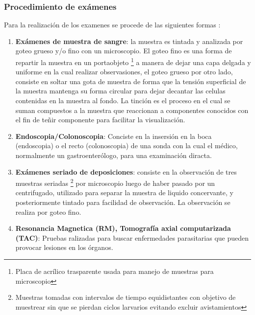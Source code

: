 \documentclass[letter,12pt]{report}
\begin{document}
\subsubsection{Procedimiento de exámenes}

Para la realización de los examenes se procede de las siguientes formas \cite{c01}:

\begin{enumerate}
    \item \textbf{Exámenes de muestra de sangre}: la muestra es tintada y analizada por
        goteo grueso y/o fino con un microscopio. El goteo fino es una forma de repartir
        la muestra en un portaobjeto \footnote{Placa de acrílico trasparente usada para
        manejo de muestras para microscopio} a manera de dejar una capa delgada y
        uniforme en la cual realizar observasiones, el goteo grueso por otro lado,
        consiste en soltar una gota de muestra de forma que la tensión superficial de la
        muestra mantenga su forma circular para dejar decantar las celulas contenidas en
        la muestra al fondo.  La tinción es el proceso en el cual se suman compuestos a
        la muestra que reaccionan a componentes conocidos con el fin de teñir componente
        para facilitar la visualización.
    \item \textbf{Endoscopia/Colonoscopia}: Conciste en la insersión en la boca
        (endoscopia) o el recto (colonoscopia) de una sonda con la cual el médico,
        normalmente un gastroenterólogo, para una examinación diracta.
    \item \textbf{Exámenes seriado de deposiciones}: consiste en la observación de tres
        muestras seriadas \footnote{Muestras tomadas con intervalos de tiempo
        equidistantes con objetivo de muestrear sin que se pierdan ciclos larvarios
        evitando excluir avistamientos} por microscopio luego de haber pasado por
        un centrifugado, utilizado para separar la muestra de liquido concervante, y
        posteriormente tintado para facilidad de observación. La observación se realiza por
        goteo fino.
    \item \textbf{Resonancia Magnetica (RM), Tomografía axial computarizada (TAC)}:
        Pruebas ralizadas para buscar enfermedades parasitarias que pueden provocar
        lesiones en los órganos.
\end{enumerate}

\end{document}
